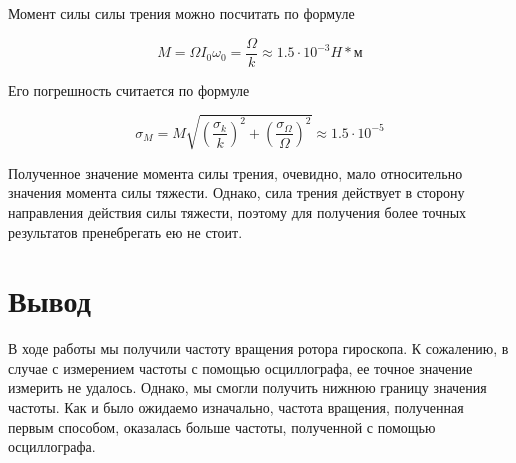 \documentclass[12pt, a4paper]{article}
\begin{document}
Момент силы силы трения можно посчитать по формуле 

\begin{equation}
	M = \varOmega I_0\omega_0 = \frac{\varOmega}{k} \approx 1.5 \cdot 10^{-3} H*\text{м}
\end{equation}

Его погрешность считается по формуле

\begin{equation}
	\sigma_M = M \sqrt{(\frac{\sigma_k}{k})^2 + (\frac{\sigma_{\varOmega}}{\varOmega})^2} \approx 1.5 \cdot 10^{-5} \text{}
\end{equation}

Полученное значение момента силы трения, очевидно, мало относительно значения момента силы тяжести.
Однако, сила трения действует в сторону направления действия силы тяжести, поэтому для получения более точных результатов пренебрегать ею не стоит.

\section{Вывод}
В ходе работы мы получили частоту вращения ротора гироскопа. К сожалению, в случае с измерением частоты с помощью осциллографа, ее точное значение измерить не удалось.
Однако, мы смогли получить нижнюю границу значения частоты. Как и было ожидаемо изначально,
частота вращения, полученная первым способом, оказалась больше частоты, полученной с помощью осциллографа.
\end{document}
